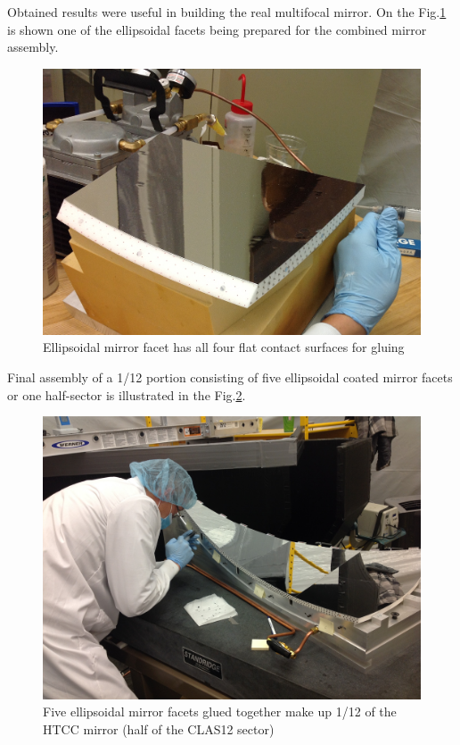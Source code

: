 \indent Obtained results were useful in building the real multifocal mirror. On the Fig.\ref{fig:facet} is shown one of the ellipsoidal facets being prepared for the combined mirror assembly.

\begin{figure}[ht]
    \centering
    \includegraphics[width=1.0\linewidth]{images/Picture2.png}
    \caption{Ellipsoidal mirror facet has all four flat contact surfaces for gluing}
    \label{fig:facet}
\end{figure}

\indent Final assembly of a 1/12 portion consisting of five ellipsoidal coated mirror facets or one half-sector is illustrated in the Fig.\ref{fig:one_sector}.

\begin{figure}[ht]
    \centering
    \includegraphics[trim={20cm 15cm 0 10cm },clip,width=\linewidth]{images/Picture3.JPG}
    \caption{Five ellipsoidal mirror facets glued together make up 1/12 of the HTCC mirror (half of the CLAS12 sector)}
    \label{fig:one_sector}
\end{figure}

